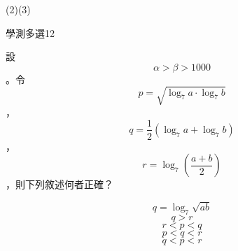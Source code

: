 \begin{QUESTIONS}
\begin{QUESTION}
\begin{QBODY}
        \end{QBODY}
        \begin{QFROMS}
        \end{QFROMS}
        \begin{QTAGS}\end{QTAGS}
        \begin{QANS}
            (2)(3)
        \end{QANS}
        \begin{QSOLLIST}
        \end{QSOLLIST}
        \begin{QEMPTYSPACE}
        \end{QEMPTYSPACE}
    \end{QUESTION}
    \begin{QUESTION}
        \begin{ExamInfo}{85}{學測}{多選}{12}
        \end{ExamInfo}
        \begin{ExamAnsRateInfo}{}{}{}{}
        \end{ExamAnsRateInfo}
        \begin{QBODY}
            	設\[\alpha >\beta >1000\]。令\[p=\sqrt{{{\log }_{7}}a\cdot {{\log }_{7}}b}\]，\[q=\frac{1}{2}\left( {{\log }_{7}}a+{{\log }_{7}}b \right)\]，\[r={{\log }_{7}}\left( \frac{a+b}{2} \right)\]，則下列敘述何者正確？
            \begin{QOPS} 
 \QOP\[q={{\log }_{7}}\sqrt{ab}\]
            \QOP\[q>r\]
            \QOP\[r<p<q\]
            \QOP\[p<q<r\]
            \QOP\[q<p<r\]
            \end{QOPS}            
            

\end{QBODY}
\end{QUESTION}
\end{QUESTIONS}
